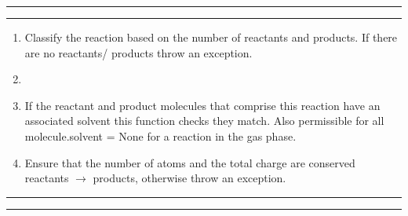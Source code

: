 \documentclass[../../main.tex]{subfiles}
\begin{document}
\vspace{0.5cm}

\hrule
{}

\hrule


\begin{enumerate}
	\item {}
	Classify the reaction based on the number of
	reactants and products. If there are no reactants/ 
	products throw an exception.
	
	\item {}
	
     \item {}
	If the reactant and product molecules that comprise
	this reaction have an associated solvent this        
	function checks they match. Also permissible for
	all molecule.solvent = None for a reaction in the
	gas phase.
	
	\item {}
	Ensure that the number of atoms and the total
	charge are conserved reactants $\rightarrow$ products,       
	otherwise throw an exception. 
\end{enumerate}

\vspace{0.5cm}
\hrule
{}
\hrule
\end{document}
